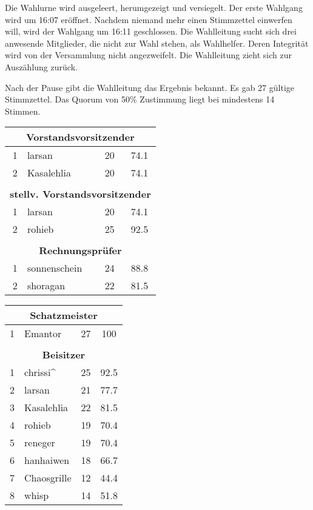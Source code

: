 \documentclass[parskip=half-]{s0minutes}
\begin{document}
Die Wahlurne wird ausgeleert, herumgezeigt und versiegelt. Der erste Wahlgang
wird um 16:07 eröffnet. Nachdem niemand mehr einen Stimmzettel einwerfen will,
wird der Wahlgang um 16:11 geschlossen. Die Wahlleitung sucht sich drei
anwesende Mitglieder, die nicht zur Wahl stehen, als Wahlhelfer. Deren
Integrität wird von der Versammlung nicht angezweifelt. Die Wahlleitung zieht
sich zur Auszählung zurück.


\clearpage
Nach der Pause gibt die Wahlleitung das Ergebnis bekannt. Es gab 27 gültige
Stimmzettel. Das Quorum von 50\% Zustimmung liegt bei mindestens 14 Stimmen.

\begin{center}
\begin{multicols}{2}
\begin{tabular}{r l l@{ Stimmen (}c@{\%)}}
	\multicolumn{4}{c}{\bfseries Vorstandsvorsitzender} \\ \hline 
	1 & larsan       & 20 & 74.1 \\
	2 & Kasalehlia   & 20 & 74.1 \\
	\\
	\multicolumn{4}{c}{\bfseries stellv. Vorstandsvorsitzender} \\ \hline
	1 & larsan       & 20 & 74.1 \\
	2 & rohieb       & 25 & 92.5 \\
	\\
	\multicolumn{4}{c}{\bfseries Rechnungsprüfer} \\ \hline
	1 & sonnenschein & 24 & 88.8 \\
	2 & shoragan     & 22 & 81.5 \\
\end{tabular}
\columnbreak
\begin{tabular}{r l l@{ Stimmen (}c@{\%)}}
	\multicolumn{4}{c}{\bfseries Schatzmeister} \\ \hline
	1 & Emantor      & 27 & 100 \\
	\\
	\multicolumn{4}{c}{\bfseries Beisitzer} \\ \hline
	1 & chrissi\^{}  & 25 & 92.5 \\
  2 & larsan       & 21 & 77.7 \\
  3 & Kasalehlia   & 22 & 81.5 \\
  4 & rohieb       & 19 & 70.4 \\
  5 & reneger      & 19 & 70.4 \\
  6 & hanhaiwen    & 18 & 66.7 \\
  7 & Chaosgrille  & 12 & 44.4 \\
	8 & whisp        & 14 & 51.8 \\
\end{tabular}
\end{multicols}
\end{center}
\end{document}
